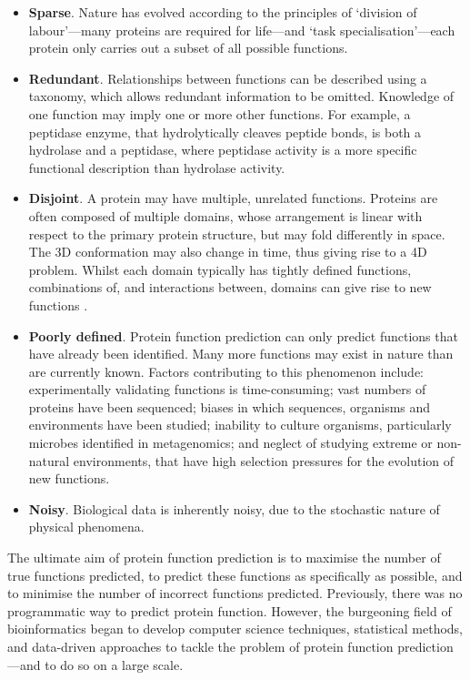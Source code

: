 \begin{itemize}
\item
  \textbf{Sparse}. Nature has evolved according to the principles of `division of labour'---many proteins are required for life---and `task specialisation'---each protein only carries out a subset of all possible functions.
\item
  \textbf{Redundant}. Relationships between functions can be described using a taxonomy, which allows redundant information to be omitted. Knowledge of one function may imply one or more other functions. For example, a peptidase enzyme, that hydrolytically cleaves peptide bonds, is both a hydrolase and a peptidase, where peptidase activity is a more specific functional description than hydrolase activity.
\item
  \textbf{Disjoint}. A protein may have multiple, unrelated functions. Proteins are often composed of multiple domains, whose arrangement is linear with respect to the primary protein structure, but may fold differently in space. The 3D conformation may also change in time, thus giving rise to a 4D problem. Whilst each domain typically has tightly defined functions, combinations of, and interactions between, domains can give rise to new functions \cite{Apic2001,Bjorklund2005}.
\item
  \textbf{Poorly defined}. Protein function prediction can only predict functions that have already been identified. Many more functions may exist in nature than are currently known. Factors contributing to this phenomenon include: experimentally validating functions is time-consuming; vast numbers of proteins have been sequenced; biases in which sequences, organisms and environments have been studied; inability to culture organisms, particularly microbes identified in metagenomics; and neglect of studying extreme or non-natural environments, that have high selection pressures for the evolution of new functions.
\item
  \textbf{Noisy}. Biological data is inherently noisy, due to the stochastic nature of physical phenomena.
\end{itemize}

The ultimate aim of protein function prediction is to maximise the number of true functions predicted, to predict these functions as specifically as possible, and to minimise the number of incorrect functions predicted. Previously, there was no programmatic way to predict protein function. However, the burgeoning field of bioinformatics began to develop computer science techniques, statistical methods, and data-driven approaches to tackle the problem of protein function prediction---and to do so on a large scale.

